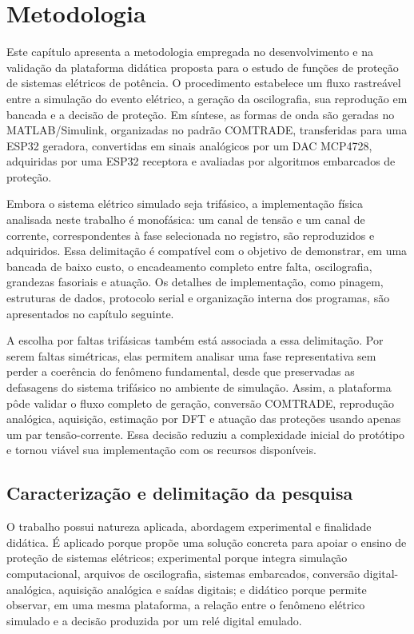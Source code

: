 \chapter{Metodologia}

Este capítulo apresenta a metodologia empregada no desenvolvimento e na validação da plataforma didática proposta para o estudo de funções de proteção de sistemas elétricos de potência. O procedimento estabelece um fluxo rastreável entre a simulação do evento elétrico, a geração da oscilografia, sua reprodução em bancada e a decisão de proteção. Em síntese, as formas de onda são geradas no MATLAB/Simulink, organizadas no padrão COMTRADE, transferidas para uma ESP32 geradora, convertidas em sinais analógicos por um DAC MCP4728, adquiridas por uma ESP32 receptora e avaliadas por algoritmos embarcados de proteção.

Embora o sistema elétrico simulado seja trifásico, a implementação física analisada neste trabalho é monofásica: um canal de tensão e um canal de corrente, correspondentes à fase selecionada no registro, são reproduzidos e adquiridos. Essa delimitação é compatível com o objetivo de demonstrar, em uma bancada de baixo custo, o encadeamento completo entre falta, oscilografia, grandezas fasoriais e atuação. Os detalhes de implementação, como pinagem, estruturas de dados, protocolo serial e organização interna dos programas, são apresentados no capítulo seguinte.

A escolha por faltas trifásicas também está associada a essa delimitação. Por serem faltas simétricas, elas permitem analisar uma fase representativa sem perder a coerência do fenômeno fundamental, desde que preservadas as defasagens do sistema trifásico no ambiente de simulação. Assim, a plataforma pôde validar o fluxo completo de geração, conversão COMTRADE, reprodução analógica, aquisição, estimação por DFT e atuação das proteções usando apenas um par tensão-corrente. Essa decisão reduziu a complexidade inicial do protótipo e tornou viável sua implementação com os recursos disponíveis.

\section{Caracterização e delimitação da pesquisa}

O trabalho possui natureza aplicada, abordagem experimental e finalidade didática. É aplicado porque propõe uma solução concreta para apoiar o ensino de proteção de sistemas elétricos; experimental porque integra simulação computacional, arquivos de oscilografia, sistemas embarcados, conversão digital-analógica, aquisição analógica e saídas digitais; e didático porque permite observar, em uma mesma plataforma, a relação entre o fenômeno elétrico simulado e a decisão produzida por um relé digital emulado.

